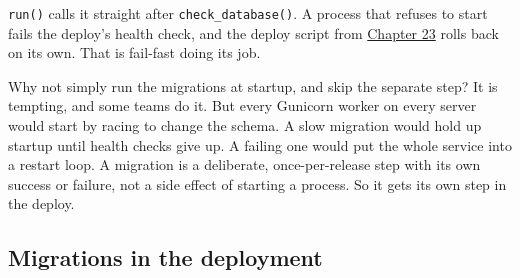 \begin{codebox}[short]

\begin{Shaded}
\begin{Highlighting}[]

\OperatorTok{=}
            \SpecialCharTok{\{}\StringTok{\textquotesingle{}, \textquotesingle{}}\SpecialCharTok{\}}
\NormalTok{        )}
\NormalTok{)}
\end{Highlighting}
\end{Shaded}

\end{codebox}

\noindent{}\texttt{run()} calls it straight after \texttt{check\_database()}. A process that refuses to start fails the deploy's health check, and the deploy script from \hyperref[ch:23-code-transfer]{Chapter 23} rolls back on its own. That is fail-fast doing its job.

Why not simply run the migrations at startup, and skip the separate step? It is tempting, and some teams do it. But every Gunicorn worker on every server would start by racing to change the schema. A slow migration would hold up startup until health checks give up. A failing one would put the whole service into a restart loop. A migration is a deliberate, once-per-release step with its own success or failure, not a side effect of starting a process. So it gets its own step in the deploy.

\subsection*{Migrations in the deployment}\label{33-logic-execution:migrations-in-the-deployment}

